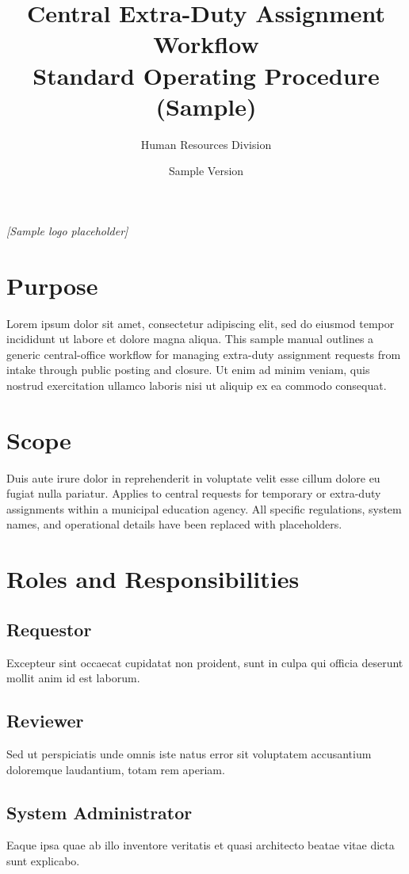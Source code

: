\documentclass[11pt,a4paper,oneside]{article}
\title{Central Extra-Duty Assignment Workflow\\Standard Operating Procedure (Sample)}
\author{Human Resources Division}
\date{Sample Version}
\begin{document}
\maketitle

\begin{center}
  \vspace{6pt}
  \textit{[Sample logo placeholder]}
\end{center}

\newpage
\tableofcontents
\newpage

\section{Purpose}
Lorem ipsum dolor sit amet, consectetur adipiscing elit, sed do eiusmod tempor incididunt ut labore et dolore magna aliqua. This sample manual outlines a generic central-office workflow for managing extra-duty assignment requests from intake through public posting and closure. Ut enim ad minim veniam, quis nostrud exercitation ullamco laboris nisi ut aliquip ex ea commodo consequat.

\section{Scope}
Duis aute irure dolor in reprehenderit in voluptate velit esse cillum dolore eu fugiat nulla pariatur. Applies to central requests for temporary or extra-duty assignments within a municipal education agency. All specific regulations, system names, and operational details have been replaced with placeholders.

\section{Roles and Responsibilities}
\subsection{Requestor}
Excepteur sint occaecat cupidatat non proident, sunt in culpa qui officia deserunt mollit anim id est laborum.

\subsection{Reviewer}
Sed ut perspiciatis unde omnis iste natus error sit voluptatem accusantium doloremque laudantium, totam rem aperiam.

\subsection{System Administrator}
Eaque ipsa quae ab illo inventore veritatis et quasi architecto beatae vitae dicta sunt explicabo.
\end{document}
